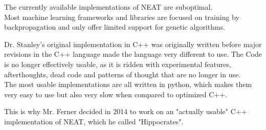 The currently available implementations of NEAT are suboptimal. \\
Most machine learning frameworks and libraries are focused on training by backpropagation and only offer limited support for genetic algorithms.

Dr. Stanley's original implementation in C++ \cite{Stanley2011} was originally written before major revisions in the C++ language made the language very different to use. \cite{Stroustrup}
The Code is no longer effectively usable, as it is ridden with experimental features, afterthoughts, dead code and patterns of thought that are no longer in use. \\
The most usable implementations are all written in python, which makes them very easy to use but also very slow when compared to optimized C++.

This is why Mr. Ferner decided in 2014 to work on an "actually usable" C++ implementation of NEAT, which he called "Hippocrates".
